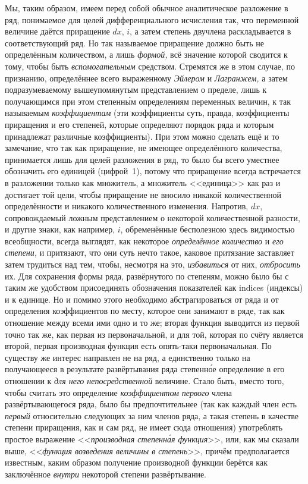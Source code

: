 Мы, таким образом, имеем перед собой обычное аналитическое разложение в ряд,
понимаемое для целей дифференциального исчисления так, что переменной величине
даётся приращение $dx$, $i$, а затем степень двучлена раскладывается в
соответствующий ряд. Но так называемое приращение должно быть не определённым
количеством, а лишь {\em формой,} всё значение которой сводится к тому, чтобы
быть {\em вспомогательным} средством. Стремятся же в этом случае, по признанию,
определённее всего выраженному {\em Эйлером} и {\em Лагранжем,} а затем
подразумеваемому вышеупомянутым представлением о пределе, лишь к получающимся
при этом степенн\'{ы}м определениям переменных величин, к так называемым
{\em коэффициентам} (эти коэффициенты суть, правда, коэффициенты приращения и
его степеней, которые определяют порядок ряда и которым принадлежат различные
коэффициенты). При этом можно сделать ещё и то замечание, что так как
приращение, не имеющее определённого количества, принимается лишь для целей
разложения в ряд, то было бы всего уместнее обозначить его единицей (цифрой~1),
потому что приращение всегда встречается в разложении только как множитель, а
множитель <<единица>> как раз и достигает той цели, чтобы приращение не вносило
никакой количественной определённости и никакого количественного изменения.
Напротив, $dx$, сопровождаемый ложным представлением о некоторой количественной
разности, и другие знаки, как например, $i$, обременённые бесполезною здесь
видимостью всеобщности, всегда выглядят, как некоторое
{\em определённое количество} и {\em его степени,} и притязают, что они суть
нечто такое, каковое притязание заставляет затем трудиться над тем, чтобы,
несмотря на это, {\em избавиться} от них, {\em отбросить} их. Для сохранения
формы ряда, развёрнутого по степеням, можно было бы с таким же удобством
присоединять обозначения показателей как indices (индексы) и к единице. Но и
помимо этого необходимо абстрагироваться от ряда и от определения коэффициентов
по месту, которое они занимают в ряде, так как отношение между всеми ими одно и
то же; вторая функция выводится из первой точно так же, как первая из
первоначальной, и для той, которая по счёту является второй, первая производная
функция есть опять-таки первоначальная. По существу же интерес направлен не на
ряд, а единственно только на получающееся в результате развёртывания ряда
степенн\'{о}е определение в его отношении к {\em для него непосредственной}
величине. Стало быть, вместо того, чтобы считать это определение
{\em коэффициентом первого} члена развёртывающегося ряда, было бы
предпочтительнее (так как каждый член есть {\em первый} относительно следующих
за ним членов ряда, а такая степень в качестве степени приращения, как и сам
ряд, не имеет сюда отношения) употреблять простое выражение <<{\em производная
степенн\'{а}я функция}>>, или, как мы сказали выше, <<{\em функция возведения
величины в степень}>>, причём предполагается известным, каким образом получение
производной функции берётся как заключённое {\em внутри} некоторой степени
развёртывание.


